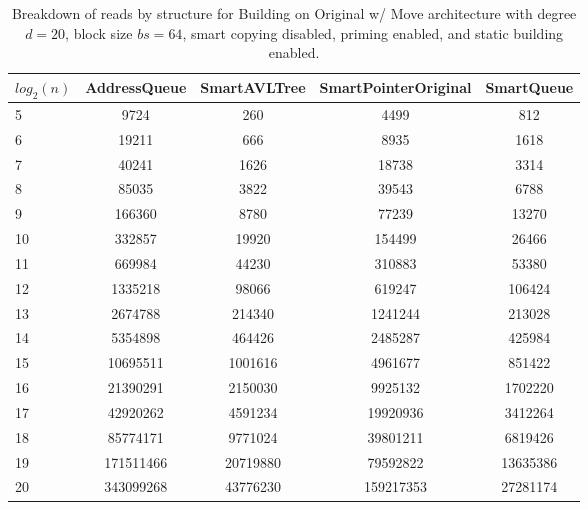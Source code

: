 \begin{table}[]
\centering
\begin{tabular}{|l|c|c|c|c|}
$log_2(n)$ & AddressQueue & SmartAVLTree & SmartPointerOriginal & SmartQueue \\ \hline
5 & 9724 & 260 & 4499 & 812 \\ \hline
6 & 19211 & 666 & 8935 & 1618 \\ \hline
7 & 40241 & 1626 & 18738 & 3314 \\ \hline
8 & 85035 & 3822 & 39543 & 6788 \\ \hline
9 & 166360 & 8780 & 77239 & 13270 \\ \hline
10 & 332857 & 19920 & 154499 & 26466 \\ \hline
11 & 669984 & 44230 & 310883 & 53380 \\ \hline
12 & 1335218 & 98066 & 619247 & 106424 \\ \hline
13 & 2674788 & 214340 & 1241244 & 213028 \\ \hline
14 & 5354898 & 464426 & 2485287 & 425984 \\ \hline
15 & 10695511 & 1001616 & 4961677 & 851422 \\ \hline
16 & 21390291 & 2150030 & 9925132 & 1702220 \\ \hline
17 & 42920262 & 4591234 & 19920936 & 3412264 \\ \hline
18 & 85774171 & 9771024 & 39801211 & 6819426 \\ \hline
19 & 171511466 & 20719880 & 79592822 & 13635386 \\ \hline
20 & 343099268 & 43776230 & 159217353 & 27281174 \\ \hline
\end{tabular}
\caption{Breakdown of reads by structure for Building on Original w/ Move architecture with degree $d=20$, block size $bs=64$, smart copying disabled, priming enabled, and static building enabled.}
    \label{tab:reads_by_structure_build_d20_bs64_copiesfalse_primetrue_staticinsertiontrue_ptoriginal_movetrue}
\end{table}

